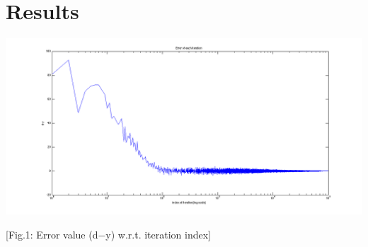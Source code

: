 \documentclass[12pt]{article}
\begin{document}
\section*{Results}
\vspace{-20pt}
\noindent\makebox[\linewidth]{\rule{\textwidth}{0.4pt}}

\hspace*{-5em}
\includegraphics[scale=.45]{../res/error.png}
\begin{center}
	[Fig.1: Error value (d$-$y) w.r.t. iteration index]
\end{center}
\end{document}

